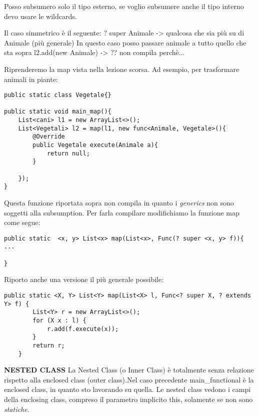 \noindent Posso subsumero solo il tipo esterno, se voglio subsumere anche il tipo interno devo usare le wildcards. \newline

\noindent Il caso simmetrico è il seguente: \newline
? super Animale -> qualcosa che sia più su di Animale (più generale) \newline
In questo caso posso passare animale a tutto quello che sta sopra
l2.add(new Animale) -> ?? non compila perchè... \newline

\noindent Riprenderemo la map vista nella lezione scorsa. Ad esempio, per trasformare animali in piante: 

\begin{lstlisting}[basicstyle=\small,]
public static class Vegetale{}

public static void main_map(){
	List<cani> l1 = new ArrayList<>();
	List<Vegetali> l2 = map(l1, new func<Animale, Vegetale>(){
		@Override
		public Vegetale execute(Animale a){
			return null;
		}
	
	});
}
\end{lstlisting}

\noindent Questa funzione riportata sopra non compila in quanto i \textit{generics} non sono soggetti alla subsumption. Per farla compilare modifichiamo la funzione map come segue: 

\begin{lstlisting}[basicstyle=\small,]
public static  <x, y> List<x> map(List<x>, Func(? super <x, y> f)){
...

}
\end{lstlisting}

Riporto anche una versione il più generale possibile: \newline

\begin{lstlisting}[basicstyle=\small,]
    public static <X, Y> List<Y> map(List<X> l, Func<? super X, ? extends Y> f) {
        List<Y> r = new ArrayList<>();
        for (X x : l) {
            r.add(f.execute(x));
        }
        return r;
    } 
\end{lstlisting}

\noindent \textbf{NESTED CLASS}\newline
La Nested Class (o Inner Class) è totalmente senza relazione rispetto alla enclosed class (outer class).Nel caso precedente main{\_}functional è la enclosed class, in quanto sto lavorando su quella. \newline
Le nested class vedono i campi della enclosing class, compreso il parametro implicito this, solamente se non sono \textit{statiche}.

